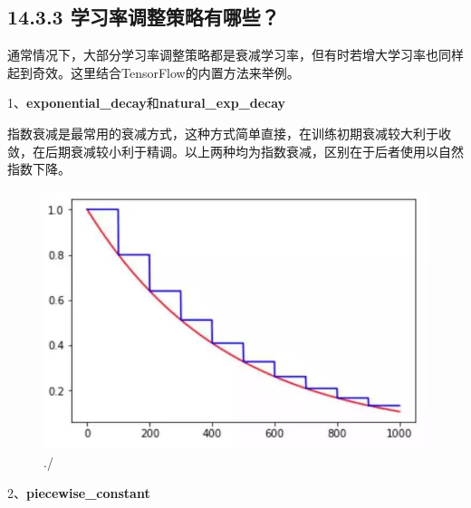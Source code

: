 \subsection{14.3.3
学习率调整策略有哪些？}\label{ux5b66ux4e60ux7387ux8c03ux6574ux7b56ux7565ux6709ux54eaux4e9b}

通常情况下，大部分学习率调整策略都是衰减学习率，但有时若增大学习率也同样起到奇效。这里结合TensorFlow的内置方法来举例。

1、\textbf{exponential\_decay}和\textbf{natural\_exp\_decay}

\begin{Shaded}
\begin{Highlighting}[]
\OperatorTok{=}\OperatorTok{=}\NormalTok{)}

\OperatorTok{=}\OperatorTok{=}\NormalTok{)}
\end{Highlighting}
\end{Shaded}

指数衰减是最常用的衰减方式，这种方式简单直接，在训练初期衰减较大利于收敛，在后期衰减较小利于精调。以上两种均为指数衰减，区别在于后者使用以自然指数下降。

\begin{figure}
\centering
\includegraphics{./img/ch14/指数衰减.jpeg}
\caption{./}
\end{figure}

2、\textbf{piecewise\_constant}

